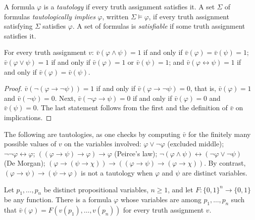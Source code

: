 \begin{definition}\label{logic:definition-tautology}
A formula $\varphi$ is a \emph{tautology} if every truth assignment satisfies
it. A set $\Sigma$ of formulas \emph{tautologically implies} $\varphi$, written
$\Sigma \models \varphi$, if every truth assignment satisfying $\Sigma$
satisfies $\varphi$. A set of formulas is \emph{satisfiable} if some truth
assignment satisfies it.
\end{definition}

\begin{lemma}\label{logic:lemma-abbreviations}
For every truth assignment $v$: $\bar v(\varphi \wedge \psi) = 1$ if and only
if $\bar v(\varphi) = \bar v(\psi) = 1$; $\bar v(\varphi \vee \psi) = 1$ if and
only if $\bar v(\varphi) = 1$ or $\bar v(\psi) = 1$; and
$\bar v(\varphi \leftrightarrow \psi) = 1$ if and only if
$\bar v(\varphi) = \bar v(\psi)$.
\end{lemma}

\begin{proof}
$\bar v(\neg(\varphi \to \neg\psi)) = 1$ if and only if
$\bar v(\varphi \to \neg\psi) = 0$, that is, $\bar v(\varphi) = 1$ and
$\bar v(\neg\psi) = 0$. Next, $\bar v(\neg\varphi \to \psi) = 0$ if and only if
$\bar v(\varphi) = 0$ and $\bar v(\psi) = 0$. The last statement follows from
the first and the definition of $\bar v$ on implications.
\end{proof}

\begin{example}\label{logic:example-tautologies}
The following are tautologies, as one checks by computing $\bar v$ for the
finitely many possible values of $v$ on the variables involved:
$\varphi \vee \neg\varphi$ (excluded middle);
$\neg\neg\varphi \leftrightarrow \varphi$;
$((\varphi \to \psi) \to \varphi) \to \varphi$ (Peirce's law);
$\neg(\varphi \wedge \psi) \leftrightarrow (\neg\varphi \vee \neg\psi)$ (De Morgan);
$(\varphi \to (\psi \to \chi)) \to ((\varphi \to \psi) \to (\varphi \to \chi))$.
By contrast, $(\varphi \to \psi) \to (\psi \to \varphi)$ is not a tautology when
$\varphi$ and $\psi$ are distinct variables.
\end{example}

\begin{proposition}\label{logic:proposition-functional-completeness}
Let $p_1, \ldots, p_n$ be distinct propositional variables, $n \geq 1$, and
let $F \colon \{0,1\}^n \to \{0,1\}$ be any function. There is a formula
$\varphi$ whose variables are among $p_1, \ldots, p_n$ such that
$\bar v(\varphi) = F(v(p_1), \ldots, v(p_n))$ for every truth assignment $v$.
\end{proposition}

